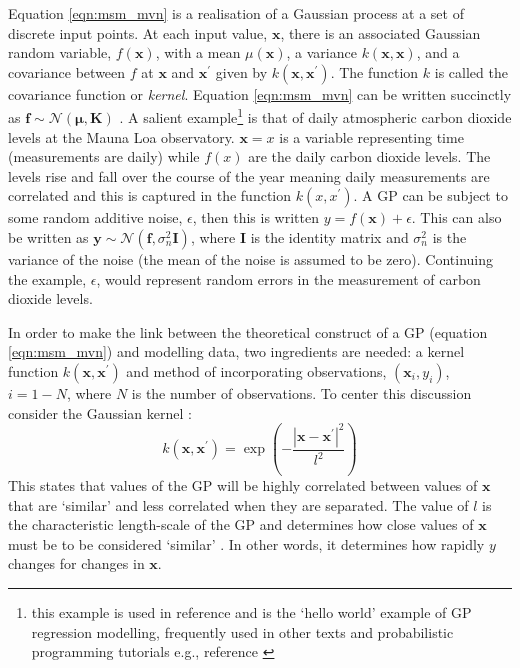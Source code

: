 Equation \ref{eqn:msm_mvn} is a realisation of a Gaussian process at a set of discrete input points. At each  input value, $\mathbf{x}$, there is an associated Gaussian random variable, $f(\mathbf{x})$, with a mean $\mu(\mathbf{x})$, a variance $k(\mathbf{x}, \mathbf{x})$, and a covariance between $f$ at $\mathbf{x}$ and  $\mathbf{x}^{\prime}$ given by $k(\mathbf{x}, \mathbf{x}^{\prime})$. The function $k$ is called the covariance function or \emph{kernel}.  Equation \ref{eqn:msm_mvn} can be written succinctly as $\mathbf{f} \sim \mathcal{N}(\bm{\mu}, \mathbf{K})$ \cite{rasmussenGaussianProcessesMachine2006}. A salient example\footnote{this example is used in reference \cite{rasmussenGaussianProcessesMachine2006} and is the `hello world' example of GP regression modelling, frequently used in other texts and probabilistic programming tutorials e.g., reference \cite{salvatierProbabilisticProgrammingPython2016}} is that of daily atmospheric carbon dioxide levels at the Mauna Loa observatory.  $\mathbf{x} = x$ is a variable representing time (measurements are daily) while $f(x)$ are the daily carbon dioxide levels. The levels rise and fall over the course of the year meaning daily measurements are correlated and this is captured in the function $k(x, x^{\prime})$.  A GP can be subject to some random additive noise, $\epsilon$,  then this is written $y = f(\mathbf{x}) + \epsilon$. This can also be written as $\mathbf{y} \sim \mathcal{N}(\mathbf{f}, \sigma_{n}^{2}\mathbf{I})$, where $\mathbf{I}$ is the identity matrix and $\sigma_{n}^{2}$ is the variance of the noise \cite{rasmussenGaussianProcessesMachine2006} (the mean of the noise is assumed to be zero).  Continuing the example, $\epsilon$, would represent random errors in the measurement of carbon dioxide levels. 

In order to make the link between the theoretical construct of a GP (equation \ref{eqn:msm_mvn}) and modelling data, two ingredients are needed: a kernel function $k(\mathbf{x}, \mathbf{x}^{\prime})$ and method of incorporating observations, $(\mathbf{x}_{i}, y_{i})$, $i = 1 - N$, where $N$ is the number of observations.  To center this discussion consider the Gaussian kernel \cite{rasmussenGaussianProcessesMachine2006}: 
\begin{equation}\label{eqn:eg_rbf}
    k(\mathbf{x}, \mathbf{x}^{\prime}) = \exp{\left(-\frac{\left|\mathbf{x}-\mathbf{x}^{\prime}\right|^{2}}{l^{2}}\right)}
\end{equation}\label{eqn:msm_rbf}
This states that values of the GP will be highly correlated between values of $\mathbf{x}$ that are `similar' and less correlated when they are separated. The value of $l$ is the characteristic length-scale of the GP and determines how close values of $\mathbf{x}$ must be to be considered `similar' \cite{rasmussenGaussianProcessesMachine2006}. In other words, it determines how rapidly  $y$ changes for changes in $\mathbf{x}$. 

